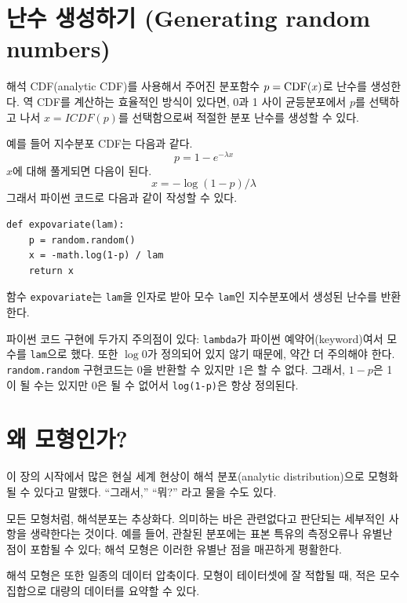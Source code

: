 \section{난수 생성하기 (Generating random numbers)}

해석 CDF(analytic CDF)를 사용해서 주어진 분포함수 $p = \mathrm{CDF}(x)$로 난수를 생성한다. 역 CDF를 계산하는 효율적인 방식이 있다면, 
0과 1 사이 균등분포에서 $p$를 선택하고 나서 $x = ICDF(p)$를 선택함으로써 적절한 분포 난수를 생성할 수 있다.

예를 들어 지수분포 CDF는 다음과 같다.
%
\[ p = 1 - e^{-\lambda x} \]
%
$x$에 대해 풀게되면 다음이 된다.
%
\[ x = -\log (1 - p) / \lambda \]
%
그래서 파이썬 코드로 다음과 같이 작성할 수 있다.
%
\begin{verbatim}
def expovariate(lam):
    p = random.random()
    x = -math.log(1-p) / lam
    return x
\end{verbatim}

함수 {\tt expovariate}는 {\tt lam}을 인자로 받아
모수 {\tt lam}인 지수분포에서 생성된 난수를 반환한다.

파이썬 코드 구현에 두가지 주의점이 있다: 
\verb"lambda"가 파이썬 예약어(keyword)여서 모수를 \verb"lam"으로 했다. 또한 $\log 0$가 정의되어 있지 않기 때문에, 약간 더 주의해야 한다.
{\tt random.random} 구현코드는 0을 반환할 수 있지만 1은 할 수 없다.
그래서, $1 - p$은 1이 될 수는 있지만 0은 될 수 없어서 {\tt log(1-p)}은 항상 정의된다. 


\section{왜 모형인가?}

이 장의 시작에서 많은 현실 세계 현상이 해석 분포(analytic distribution)으로 모형화될 수 있다고 말했다.
``그래서,'' ``뭐?'' 라고 물을 수도 있다.

모든 모형처럼, 해석분포는 추상화다. 의미하는 바은 관련없다고 판단되는 세부적인 사항을 생략한다는 것이다. 예를 들어, 관찰된 분포에는 표본 특유의 측정오류나 유별난 점이 포함될 수 있다; 해석 모형은 이러한 유별난 점을 매끈하게 평활한다.

해석 모형은 또한 일종의 데이터 압축이다. 모형이 테이터셋에 잘 적합될 때, 적은 모수 집합으로 대량의 데이터를 요약할 수 있다.

